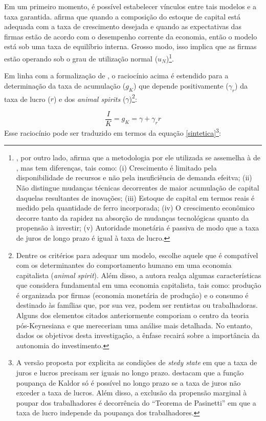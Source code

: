 Em um primeiro momento, é possível estabelecer vínculos entre tais modelos e a taxa garantida. \textcite{robinson_model_1962} afirma que quando a composição do estoque de capital está adequada com a taxa de crescimento desejada e quando as expectativas das firmas estão de acordo com o desempenho corrente da economia, então o modelo está sob uma taxa de equilíbrio interna. Grosso modo, isso implica que as firmas estão operando sob o grau de utilização normal ($u_N$)\footnote{\textcite{kaldor_model_1957}, por outro lado, afirma que a metodologia por ele utilizada se assemelha à de \textcite{harrod_essay_1939}, mas tem diferenças, tais como: (i) Crescimento é limitado pela disponibilidade de recursos e não pela insuficiência de demanda efeitva; (ii) Não distingue mudanças técnicas decorrentes de maior acumulação de capital daquelas resultantes de inovações; (iii) Estoque de capital em termos reais é medido pela quantidade de ferro incorporada; (iv) O crescimento econômico decorre tanto da rapidez na absorção de mudanças tecnológicas quanto da propensão à investir; (v) Autoridade monetária é passiva de modo que a taxa de juros de longo prazo é igual à taxa de lucro.}. 

Em linha com a formalização de \textcite[Cap. 6]{lavoie_post-keynesian_2015}, o raciocínio acima é estendido para a determinação da taxa de acumulação ($g_K$) que depende positivamente ($\gamma_r$) da taxa de lucro ($r$) e dos \textit{animal spirits} ($\gamma$)\footnote{Dentre os critérios para adequar um modelo, \textcite{robinson_model_1962} escolhe aquele que é compatível com os determinantes do comportamento humano em uma economia capitalista (\textit{animal spirit}). Além disso, a autora realça algumas características que considera fundamental em uma economia capitalista, tais como: produção é organizada por firmas (economia monetária de produção) e o consumo é destinado às famílias que, por sua vez, podem ser rentistas ou trabalhadoras. Alguns dos elementos citados anteriormente comporiam o centro da teoria pós-Keynesiana e que mereceriam uma análise mais detalhada. No entanto, dados os objetivos desta investigação, a ênfase recairá sobre a importância da autonomia do investimento.}:

\begin{equation}
    \frac{I}{K} = g_K = \gamma + \gamma_r r
\end{equation}
Esse raciocínio pode ser traduzido em termos da equação \ref{sintetica}\footnote{A versão proposta por \textcite{pasinetti_rate_1962} explicita as condições de \textit{stedy state} em que a taxa de juros e lucros precisam ser iguais no longo prazo. \textcite[p.~101]{kurz_post-keynesian_2010} destacam que a função poupança de Kaldor só é possível no longo prazo se a taxa de juros não exceder a taxa de lucros. Além disso, a exclusão da propensão marginal à poupar dos trabalhadores é decorrência do ``Teorema de Pasinetti'' em que a taxa de lucro independe da poupança dos trabalhadores.
}:

